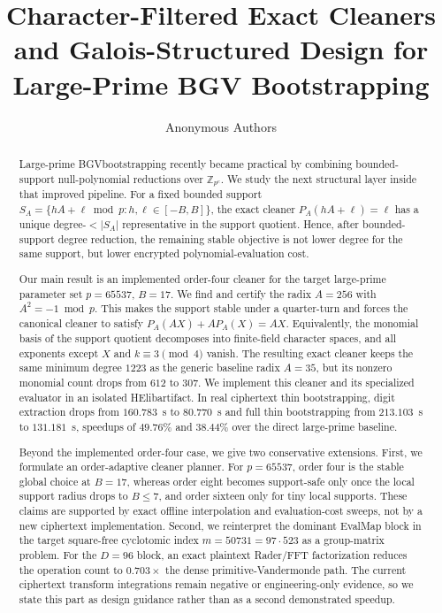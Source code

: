 \documentclass[a4paper,runningheads]{llncs}
\newcommand{\HElib}{\textsf{HElib}}
\newcommand{\BGV}{\textsf{BGV}}
\begin{document}
\title{Character-Filtered Exact Cleaners and Galois-Structured Design for Large-Prime BGV Bootstrapping}

\author{Anonymous Authors}

\maketitle

\begin{abstract}
Large-prime \BGV bootstrapping recently became practical by combining bounded-support null-polynomial reductions over $\mathbb{Z}_{p^e}$. We study the next structural layer inside that improved pipeline. For a fixed bounded support $S_A=\{hA+\ell\bmod p : h,\ell\in[-B,B]\}$, the exact cleaner $P_A(hA+\ell)=\ell$ has a unique degree-$<|S_A|$ representative in the support quotient. Hence, after bounded-support degree reduction, the remaining stable objective is not lower degree for the same support, but lower encrypted polynomial-evaluation cost.

Our main result is an implemented order-four cleaner for the target large-prime parameter set $p=65537$, $B=17$. We find and certify the radix $A=256$ with $A^2=-1\bmod p$. This makes the support stable under a quarter-turn and forces the canonical cleaner to satisfy $P_A(AX)+AP_A(X)=AX$. Equivalently, the monomial basis of the support quotient decomposes into finite-field character spaces, and all exponents except $X$ and $k\equiv3\pmod4$ vanish. The resulting exact cleaner keeps the same minimum degree $1223$ as the generic baseline radix $A=35$, but its nonzero monomial count drops from $612$ to $307$. We implement this cleaner and its specialized evaluator in an isolated \HElib artifact. In real ciphertext thin bootstrapping, digit extraction drops from $160.783$~s to $80.770$~s and full thin bootstrapping from $213.103$~s to $131.181$~s, speedups of $49.76\%$ and $38.44\%$ over the direct large-prime baseline.

Beyond the implemented order-four case, we give two conservative extensions. First, we formulate an order-adaptive cleaner planner. For $p=65537$, order four is the stable global choice at $B=17$, whereas order eight becomes support-safe only once the local support radius drops to $B\le7$, and order sixteen only for tiny local supports. These claims are supported by exact offline interpolation and evaluation-cost sweeps, not by a new ciphertext implementation. Second, we reinterpret the dominant EvalMap block in the target square-free cyclotomic index $m=50731=97\cdot523$ as a group-matrix problem. For the $D=96$ block, an exact plaintext Rader/FFT factorization reduces the operation count to $0.703\times$ the dense primitive-Vandermonde path. The current ciphertext transform integrations remain negative or engineering-only evidence, so we state this part as design guidance rather than as a second demonstrated speedup.


\end{abstract}
\end{document}
